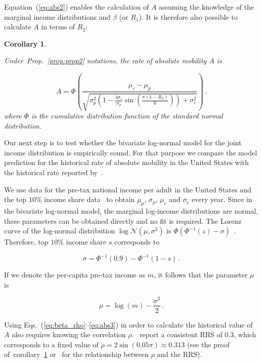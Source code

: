 \documentclass[12pt]{article}
\newtheorem{corollary}[theorem]{Corollary}
\newcommand{\elabel}[1]{\label{eq:#1}}
\newcommand{\Eref}[1]{Equation~(\ref{eq:#1})}
\newcommand{\pref}[1]{Prop.~\ref{prop:#1}}
\newcommand{\clabel}[1]{\label{coro:#1}}
\newcommand{\creflong}[1]{corollary~\ref{coro:#1}}
\newcommand{\be}{\begin{equation}}
\newcommand{\ee}{\end{equation}}
\numberwithin{equation}{section}
\begin{document}
\Eref{abs2} enables the calculation of $A$ assuming the knowledge of the marginal income distributions and $\beta$ (or $R_1$). It is therefore also possible to calculate $A$ in terms of $R_2$:

\begin{corollary}
\clabel{coro1}

Under~\pref{prop2} notations, the rate of absolute mobility $A$ is

\be
A = \Phi\left(\frac{\mu_c - \mu_p}{\sqrt{\sigma_p^2\left(1 - \frac{4\sigma_c}{\sigma_p}\sin{\left(\frac{\pi\left(1-R_2\right)}{6}\right)}\right) + \sigma_c^2}}\right) \,.
\elabel{abs3}
\ee
where $\Phi$ is the cumulative distribution function of the standard normal distribution.
\end{corollary}

Our next step is to test whether the bivariate log-normal model for the joint income distribution is empirically sound. For that purpose we compare the model prediction for the historical rate of absolute mobility in the United States with the historical rate reported by~\citet{chetty2017fading}.

We use data for the pre-tax national income per adult in the United States and the top $10\%$ income share data~\citep{WID2017} to obtain $\mu_p$, $\sigma_p$, $\mu_c$ and $\sigma_c$ every year. Since in the bivariate log-normal model, the marginal log-income distributions are normal, these parameters can be obtained directly and no fit is required. The Lorenz curve of the log-normal distribution $\log{\mathcal{N}}\left(\mu,\sigma^2\right)$ is $\Phi\left(\Phi^{-1}\left(z\right)-\sigma\right)$~\citep{cowell2011measuring}. Therefore, top $10\%$ income share $s$ corresponds to

\be
\sigma = \Phi^{-1}\left(0.9\right) - \Phi^{-1}\left(1-s\right)\,.
\ee

If we denote the per-capita pre-tax income as $m$, it follows that the parameter $\mu$ is

\be
\mu = \log{\left(m\right)} - \frac{\sigma^2}{2}\,.
\ee

Using Eqs.~(\ref{eq:beta_rho}--\ref{eq:abs3}) in order to calculate the historical value of $A$ also requires knowing the correlation $\rho$.~\citet{chetty2014united} report a consistent RRS of $0.3$, which corresponds to a fixed value of $\rho=2\sin{\left(0.05\pi\right)}\approx0.313$ (see the proof of~\creflong{coro1} or~\citet{trivedi2007copula} for the relationship between $\rho$ and the RRS).
\end{document}
